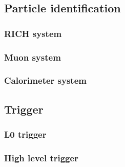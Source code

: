 \subsection{Particle identification}
\subsubsection{RICH system}
\subsubsection{Muon system}
\subsubsection{Calorimeter system}

\subsection{Trigger}
\subsubsection{L0 trigger}
\subsubsection{High level trigger}